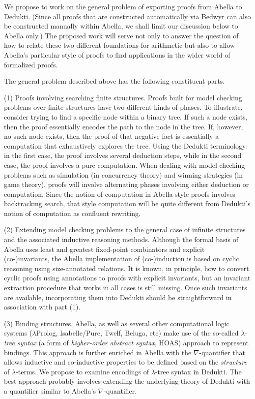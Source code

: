 We propose to work on the general problem of exporting proofs from
Abella to Dedukti.  (Since all proofs that are constructed
automatically via Bedwyr can also be constructed manually within
Abella, we shall limit our discussion below to Abella only.)  The
proposed work will serve not only to answer the question of how to
relate these two different foundations for arithmetic but also to
allow Abella's particular style of proofs to find applications in the
wider world of formalized proofs.

The general problem described above has the following constituent parts.

(1) Proofs involving searching finite structures. Proofs built for
model checking problems over finite structures have two different
kinds of phases.  To illustrate, consider trying to find a specific
node within a binary tree.  If such a node exists, then the proof
essentially encodes the path to the node in the tree.  If, however, no
such node exists, then the proof of that negative fact is essentially
a computation that exhaustively explores the tree.  Using the Dedukti
terminology: in the first case, the proof involves several deduction
steps, while in the second case, the proof involves a pure
computation. When dealing with model checking problems such as
simulation (in concurrency theory) and winning strategies (in game
theory), proofs will involve alternating phases involving either
deduction or computation.  Since the notion of computation in
Abella-style proofs involves backtracking search, that style
computation will be quite different from Dedukti's notion of
computation as confluent rewriting.

(2) Extending model checking problems to the general case of infinite
structures and the associated inductive reasoning methods. Although
the formal basis of Abella uses least and greatest fixed-point
combinators and explicit (co-)invariants, the Abella implementation of
(co-)induction is based on cyclic reasoning using size-annotated
relations. It is known, in principle, how to convert cyclic proofs
using annotations to proofs with explicit invariants, but an invariant
extraction procedure that works in all cases is still missing. Once
such invariants are available, incorporating them into Dedukti should
be straightforward in association with part (1).

(3) Binding structures. Abella, as well as several other computational
logic systems ($\lambda$Prolog, Isabelle/Pure, Twelf, Beluga, etc)
make use of the so-called \emph{$\lambda$-tree syntax} (a form of
\emph{higher-order abstract syntax}, HOAS) approach to represent
bindings. This approach is further enriched in Abella with the
$\nabla$-quantifier that allows inductive and co-inductive properties
to be defined based on the \emph{structure} of $\lambda$-terms. We
propose to examine encodings of $\lambda$-tree syntax in Dedukti. The
best approach probably involves extending the underlying theory of
Dedukti with a quantifier similar to Abella's $\nabla$-quantifier.

